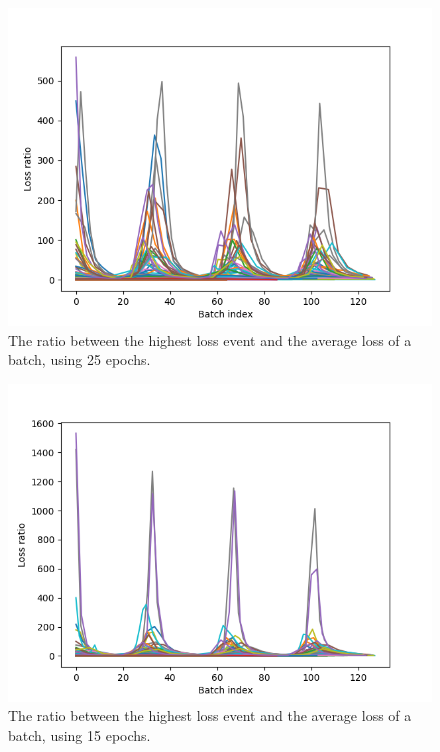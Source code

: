 \begin{figure}
	\begin{center}
		\includegraphics[scale=0.7]{experiments/epochs/25-epochs.png}
	\end{center}
	\caption{The ratio between the highest loss event and the average loss of a batch, using 25 epochs.~\label{fig:25-epochs}}
\end{figure}


\begin{figure}
	\begin{center}
		\includegraphics[scale=0.7]{experiments/epochs/15-epochs}
	\end{center}
	\caption{The ratio between the highest loss event and the average loss of a batch, using 15 epochs.~\label{fig:15-epochs}}
\end{figure}


